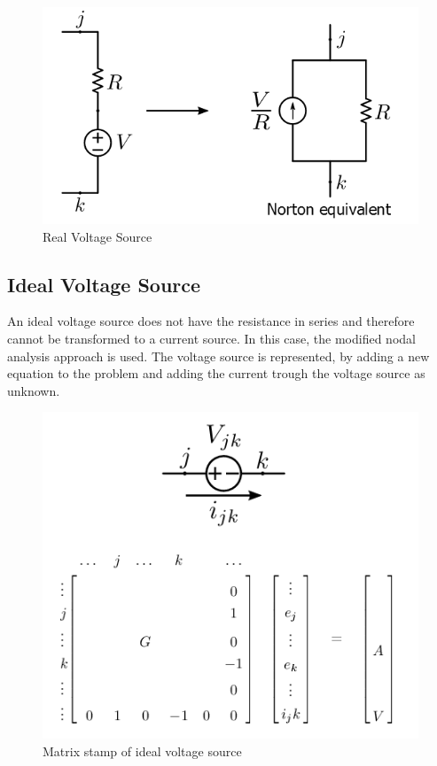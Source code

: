 \begin{figure}[ht]
	\centering
	\includegraphics[scale=0.5]{img/VoltageSourceRes.png} 
	\caption{Real Voltage Source}
	\label{fig:Real_Voltage_Source}
\end{figure}

\subsection{Ideal Voltage Source}
An ideal voltage source does not have the resistance in series and therefore cannot be transformed to a current source. In this case, the modified nodal analysis approach is used. The voltage source is represented, by adding a new equation to the problem and adding the current trough the voltage source as unknown. 

\begin{figure}
	\centering
	\includegraphics[scale=0.6]{img/IdealVoltageSource.png}
	\caption{Matrix stamp of ideal voltage source}
	\label{fig:Ideal_Voltage_Source}
\end{figure}

